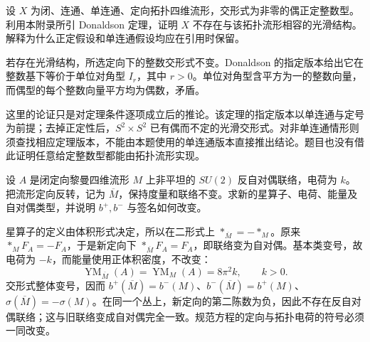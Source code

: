 \begin{exercise}\label{g3:ex:B-even-definite-obstruction}
 设 \(X\) 为闭、连通、单连通、定向拓扑四维流形，交形式为非零的偶正定整数型。利用本附录所引 Donaldson 定理，证明 \(X\) 不存在与该拓扑流形相容的光滑结构。解释为什么正定假设和单连通假设均应在引用时保留。
\end{exercise}
\begin{solution}
 若存在光滑结构，所选定向下的整数交形式不变。Donaldson 的指定版本给出它在整数基下等价于单位对角型 \(I_r\)，其中 \(r>0\)。单位对角型含平方为一的整数向量，而偶型的每个整数向量平方均为偶数，矛盾。

 这里的论证只是对定理条件逐项成立后的推论。该定理的指定版本以单连通与定号为前提；去掉正定性后，\(S^2\times S^2\) 已有偶而不定的光滑交形式。对非单连通情形则须查找相应定理版本，不能由本题使用的单连通版本直接推出结论。题目也没有借此证明任意给定整数型都能由拓扑流形实现。
\end{solution}

\begin{exercise}\label{g3:ex:B-orientation-reversal}
 设 \(A\) 是闭定向黎曼四维流形 \(M\) 上非平坦的 \(SU(2)\) 反自对偶联络，电荷为 \(k\)。把流形定向反转，记为 \(\overline M\)，保持度量和联络不变。求新的星算子、电荷、能量及自对偶类型，并说明 \(b^+,b^-\) 与签名如何改变。
\end{exercise}
\begin{solution}
 星算子的定义由体积形式决定，所以在二形式上 \(*_{\overline M}=-*_M\)。原来 \(*_MF_A=-F_A\)，于是新定向下 \(*_{\overline M}F_A=F_A\)，即联络变为自对偶。基本类变号，故电荷为 \(-k\)，而能量使用正体积密度，不改变：
 \[
  \operatorname{YM}_{\overline M}(A)=\operatorname{YM}_M(A)=8\pi^2k,
  \qquad k>0.
 \]
 交形式整体变号，因而 \(b^+(\overline M)=b^-(M)\)、\(b^-(\overline M)=b^+(M)\)、\(\sigma(\overline M)=-\sigma(M)\)。在同一个丛上，新定向的第二陈数为负，因此不存在反自对偶联络；这与旧联络变成自对偶完全一致。规范方程的定向与拓扑电荷的符号必须一同改变。
\end{solution}
